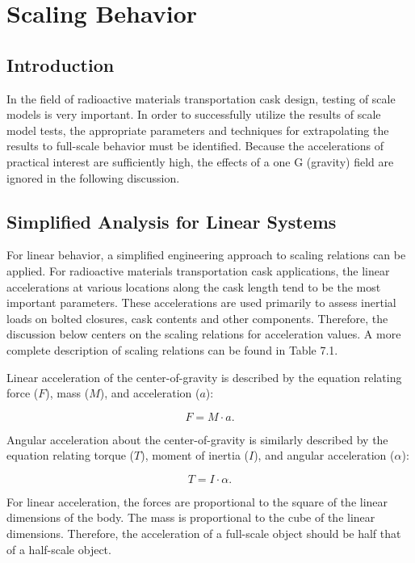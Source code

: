 \chapter{Scaling Behavior}

\section{Introduction}

     In the field of radioactive materials transportation cask design, 
testing of scale models is very important.  In order to successfully 
utilize the results of scale model tests, the appropriate parameters 
and techniques for extrapolating the results to full-scale behavior 
must be identified.  Because the accelerations of practical interest
are sufficiently high, the effects of a one G (gravity) field are 
ignored in the following discussion.

\section{Simplified Analysis for Linear Systems}

     For linear behavior, a simplified engineering approach to scaling
relations can be applied.  For radioactive materials transportation
cask applications, the linear accelerations at various locations along
the cask length tend to be the most important parameters.  These
accelerations are used primarily to assess inertial loads on bolted
closures, cask contents and other components.  Therefore, the
discussion below centers on the scaling relations for acceleration
values.  A more complete description of scaling relations can be found
in Table 7.1. 

Linear acceleration of the center-of-gravity is described
by the equation relating force ($F$), mass ($M$), 
and acceleration ($a$): 

\begin{equation}
                 F = M \cdot a.
\end{equation}

Angular acceleration about the center-of-gravity is similarly 
described by the equation relating torque ($T$), moment of 
inertia ($I$), and angular acceleration ($\alpha$): 

\begin{equation}
                 T = I \cdot \alpha.
\end{equation}

     For linear acceleration, the forces are proportional to the
square of the linear dimensions of the body.  The mass is proportional
to the cube of the linear dimensions.  Therefore, the acceleration of
a full-scale object should be half that of a half-scale object. 

